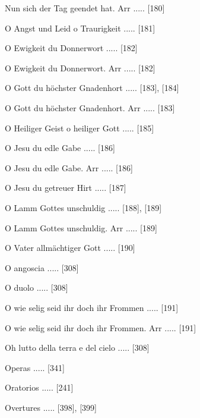 \documentclass[twocolumn, 12pt]{book}
\begin{document}
\newline 
Nun sich der Tag geendet hat. Arr ..... [180]

\newline 
O Angst und Leid o Traurigkeit ..... [181]

\newline 
O Ewigkeit du Donnerwort ..... [182]

\newline 
O Ewigkeit du Donnerwort. Arr ..... [182]

\newline 
O Gott du höchster Gnadenhort ..... [183], [184]

\newline 
O Gott du höchster Gnadenhort. Arr ..... [183]

\newline 
O Heiliger Geist o heiliger Gott ..... [185]

\newline 
O Jesu du edle Gabe ..... [186]

\newline 
O Jesu du edle Gabe. Arr ..... [186]

\newline 
O Jesu du getreuer Hirt ..... [187]

\newline 
O Lamm Gottes unschuldig ..... [188], [189]

\newline 
O Lamm Gottes unschuldig. Arr ..... [189]

\newline 
O Vater allmächtiger Gott ..... [190]

\newline 
O angoscia ..... [308]

\newline 
O duolo ..... [308]

\newline 
O wie selig seid ihr doch ihr Frommen ..... [191]

\newline 
O wie selig seid ihr doch ihr Frommen. Arr ..... [191]

\newline 
Oh lutto della terra e del cielo ..... [308]

\newline 
Operas ..... [341]

\newline 
Oratorios ..... [241]

\newline 
Overtures ..... [398], [399]
\end{document}
